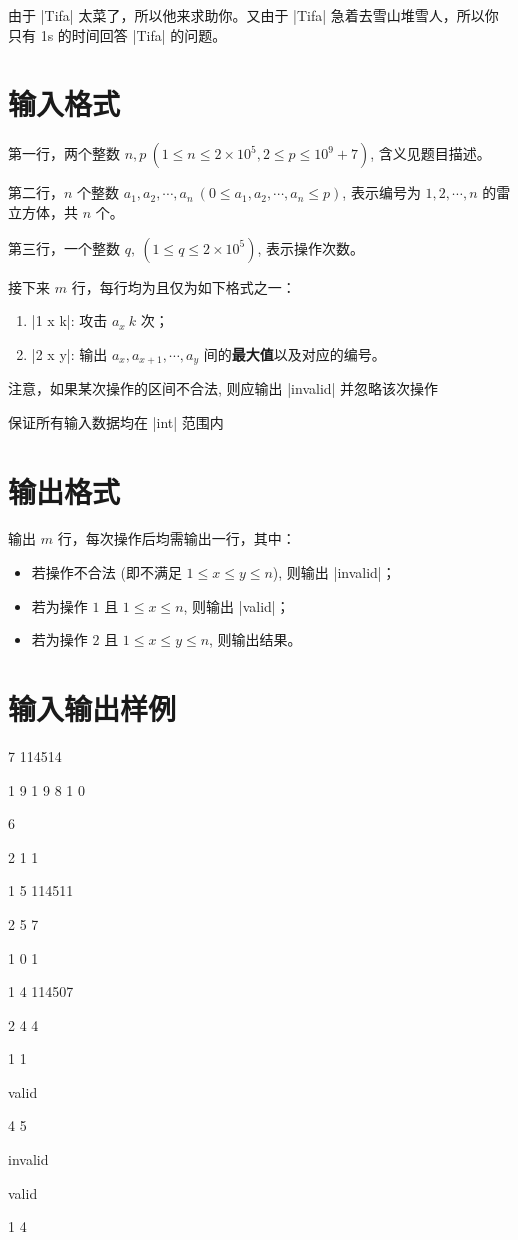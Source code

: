 \documentclass{ctpro}
\begin{document}
由于 |Tifa| 太菜了，所以他来求助你。又由于 |Tifa| 急着去雪山堆雪人，所以你只有 1s 的时间回答 |Tifa| 的问题。

\section*{输入格式}

第一行，两个整数 $n,p~(1 \leq n \leq 2 \times 10^5, 2 \leq p \leq 10^9+7)$, 含义见题目描述。

第二行，$n$ 个整数 $a_1, a_2, \cdots, a_n~(0 \leq a_1, a_2, \cdots, a_n \leq p)$, 表示编号为 $1,2, \cdots, n$ 的雷立方体，共 $n$ 个。

第三行，一个整数 $q,~(1 \leq q \leq 2 \times 10^5)$, 表示操作次数。

接下来 $m$ 行，每行均为且仅为如下格式之一：

\begin{enumerate}
	\item |1 x k|: 攻击 $a_x~k$ 次；
	\item |2 x y|: 输出 $a_x, a_{x+1}, \cdots, a_y$ 间的\textbf{最大值}以及对应的编号。
\end{enumerate}

注意，如果某次操作的区间不合法, 则应输出 |invalid| 并忽略该次操作

保证所有输入数据均在 |int| 范围内

\section*{输出格式}

输出 $m$ 行，每次操作后均需输出一行，其中：

\begin{itemize}
	\item 若操作不合法 (即不满足 $1 \leq x \leq y \leq n$), 则输出 |invalid|；
	\item 若为操作 $1$ 且 $1 \leq x \leq n$, 则输出 |valid|；
	\item 若为操作 $2$ 且 $1 \leq x \leq y \leq n$, 则输出结果。
\end{itemize}

\section*{输入输出样例}
\testcasetab
{
	7 114514\par
    1 9 1 9 8 1 0\par
    6\par
    2 1 1\par
    1 5 114511\par
    2 5 7\par
    1 0 1\par
    1 4 114507\par
    2 4 4
}
{
    1 1\par
    valid\par
    4 5\par
    invalid\par
    valid\par
    1 4
}
\end{document}
